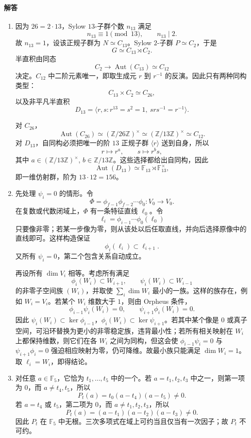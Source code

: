 \documentclass[UTF8,12pt]{ctexart}
\begin{document}
\paragraph{解答}
\begin{enumerate}[label=\textbf{\arabic*.},leftmargin=2.2em]
\item 因为 \(26=2\cdot13\)，Sylow \(13\)-子群个数 \(n_{13}\) 满足
\[
n_{13}\equiv1\pmod{13},\qquad n_{13}\mid2.
\]
故 \(n_{13}=1\)，设该正规子群为 \(N\simeq C_{13}\)。Sylow \(2\)-子群 \(P\simeq C_2\)，于是
\[
G\simeq C_{13}\rtimes C_2.
\]
半直积由同态
\[
C_2\to \operatorname{Aut}(C_{13})\simeq C_{12}
\]
决定。\(C_{12}\) 中二阶元素唯一，即取生成元 \(r\) 到 \(r^{-1}\) 的反演。因此只有两种同构类型：
\[
C_{13}\times C_2\simeq C_{26},
\]
以及非平凡半直积
\[
D_{13}=\langle r,s:r^{13}=s^2=1,\ srs^{-1}=r^{-1}\rangle.
\]

对 \(C_{26}\)，
\[
\operatorname{Aut}(C_{26})\simeq(\mathbb Z/26\mathbb Z)^\times\simeq(\mathbb Z/13\mathbb Z)^\times\simeq C_{12}.
\]
对 \(D_{13}\)，自同构必须把唯一的阶 \(13\) 正规子群 \(\langle r\rangle\) 送到自身，所以
\[
r\mapsto r^a,\qquad s\mapsto r^b s,
\]
其中 \(a\in(\mathbb Z/13\mathbb Z)^\times\), \(b\in\mathbb Z/13\mathbb Z\)。这些选择都给出自同构，因此
\[
\operatorname{Aut}(D_{13})\simeq \mathbb F_{13}\rtimes\mathbb F_{13}^\times,
\]
即一维仿射群，阶为 \(13\cdot12=156\)。

\item 先处理 \(\psi_i=0\) 的情形。令
\[
\Phi=\phi_{f-1}\phi_{f-2}\cdots\phi_0:V_0\to V_0.
\]
在复数或代数闭域上，\(\Phi\) 有一条特征直线 \(\ell_0\)。令
\[
\ell_i=\phi_{i-1}\cdots\phi_0(\ell_0)
\]
只要像非零；若某一步像为零，则从该处以后任取直线，并向后选择原像中的直线即可。这样构造保证
\[
\phi_i(\ell_i)\subset\ell_{i+1}.
\]
又所有 \(\psi_i=0\)，第二个包含关系自动成立。

再设所有 \(\dim V_i\) 相等。考虑所有满足
\[
\phi_i(W_i)\subset W_{i+1},\qquad \psi_i(W_i)\subset W_{i-1}
\]
的非零子空间族 \((W_i)\)，并取使 \(\sum_i\dim W_i\) 最小的一族。这样的族存在，例如 \(W_i=V_i\)。若某个 \(W_i\) 维数大于 \(1\)，则由 Orpheus 条件，
\[
\phi_{i-1}\psi_i(W_i)=0,\qquad \psi_{i+1}\phi_i(W_i)=0.
\]
因此 \(\psi_i(W_i)\subset\ker\phi_{i-1}\)，\(\phi_i(W_i)\subset\ker\psi_{i+1}\)。若其中某个像是 \(0\) 或真子空间，可沿环替换为更小的非零稳定族，违背最小性；若所有相关映射在 \(W_i\) 上都保持维数，则它们在各 \(W_i\) 之间为同构，但这会使 \(\phi_{i-1}\psi_i=0\) 与 \(\psi_{i+1}\phi_i=0\) 强迫相应映射为零，仍可降维。故最小族只能满足 \(\dim W_i=1\)。取 \(\ell_i=W_i\)，即得结论。

\item 对任意 \(a\in\mathbb F_5\)，它恰为 \(t_1,\ldots,t_5\) 中的一个。若 \(a=t_1,t_2,t_3\) 中之一，则第一项为 \(0\)，而 \(a\ne t_4,t_5\)，所以
\[
P_t(a)=t_0(a-t_4)(a-t_5)\ne0.
\]
若 \(a=t_4\) 或 \(t_5\)，第二项为 \(0\)，而 \(a\ne t_1,t_2,t_3\)，所以
\[
P_t(a)=(a-t_1)(a-t_2)(a-t_3)\ne0.
\]
因此 \(P_t\) 在 \(\mathbb F_5\) 中无根。三次多项式在域上可约当且仅当有一次因子；故 \(P_t\) 不可约。


\end{enumerate}
\end{document}

